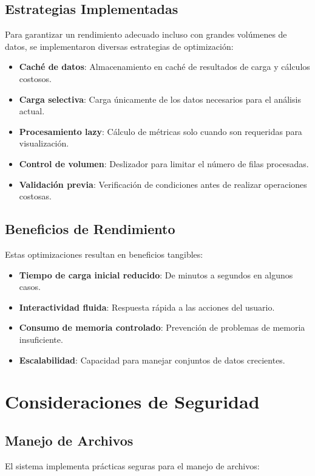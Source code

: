 \subsection{Estrategias Implementadas}
Para garantizar un rendimiento adecuado incluso con grandes volúmenes de datos, se implementaron diversas estrategias de optimización:

\begin{itemize}
    \item \textbf{Caché de datos}: Almacenamiento en caché de resultados de carga y cálculos costosos.
    \item \textbf{Carga selectiva}: Carga únicamente de los datos necesarios para el análisis actual.
    \item \textbf{Procesamiento lazy}: Cálculo de métricas solo cuando son requeridas para visualización.
    \item \textbf{Control de volumen}: Deslizador para limitar el número de filas procesadas.
    \item \textbf{Validación previa}: Verificación de condiciones antes de realizar operaciones costosas.
\end{itemize}

\subsection{Beneficios de Rendimiento}
Estas optimizaciones resultan en beneficios tangibles:

\begin{itemize}
    \item \textbf{Tiempo de carga inicial reducido}: De minutos a segundos en algunos casos.
    \item \textbf{Interactividad fluida}: Respuesta rápida a las acciones del usuario.
    \item \textbf{Consumo de memoria controlado}: Prevención de problemas de memoria insuficiente.
    \item \textbf{Escalabilidad}: Capacidad para manejar conjuntos de datos crecientes.
\end{itemize}

\section{Consideraciones de Seguridad}

\subsection{Manejo de Archivos}
El sistema implementa prácticas seguras para el manejo de archivos:

